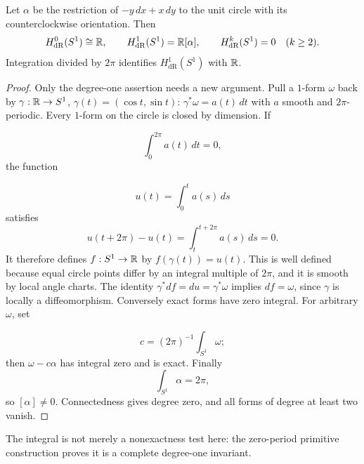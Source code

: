 \begin{theorem}\label{thm:circle-cohomology}
Let $\alpha$ be the restriction of $-y\,dx+x\,dy$ to the unit circle
with its counterclockwise orientation. Then
\[
H_{\mathrm{dR}}^0(S^1)\cong\mathbb{R},\qquad
H_{\mathrm{dR}}^1(S^1)=\mathbb{R}[\alpha],\qquad
H_{\mathrm{dR}}^k(S^1)=0\quad(k\geq2).
\]
Integration divided by $2\pi$ identifies $H_{\mathrm{dR}}^1(S^1)$ with $\mathbb{R}$.
\end{theorem}
\begin{proof}
Only the degree-one assertion needs a new argument. Pull a $1$-form
$\omega$ back by $\gamma:\mathbb{R}\to S^1$, $\gamma(t)=(\cos t,\sin t)$:
$\gamma^*\omega=a(t)\,dt$ with $a$ smooth and $2\pi$-periodic.
Every $1$-form on the circle is closed by dimension. If

\[
\int_0^{2\pi}a(t)\,dt=0,
\]
 the function

\[
u(t)=\int_0^t a(s)\,ds
\]
 satisfies
\[
u(t+2\pi)-u(t)=\int_t^{t+2\pi}a(s)\,ds=0.
\]
It therefore defines $f:S^1\to\mathbb{R}$ by $f(\gamma(t))=u(t)$.
This is well defined because equal circle points differ by an integral
multiple of $2\pi$, and it is smooth by local angle charts.
The identity $\gamma^*df=du=\gamma^*\omega$ implies $df=\omega$,
since $\gamma$ is locally a diffeomorphism. Conversely exact forms have
zero integral. For arbitrary $\omega$, set

\[
c=(2\pi)^{-1}\int_{S^1}\omega;
\]
 then $\omega-c\alpha$ has integral
zero and is exact. Finally
\[
\int_{S^1}\alpha=2\pi,
\]
 so $[\alpha]\ne0$.
Connectedness gives degree zero, and all forms of degree at least two vanish.
\end{proof}
The integral is not merely a nonexactness test here: the zero-period
primitive construction proves it is a complete degree-one invariant.

